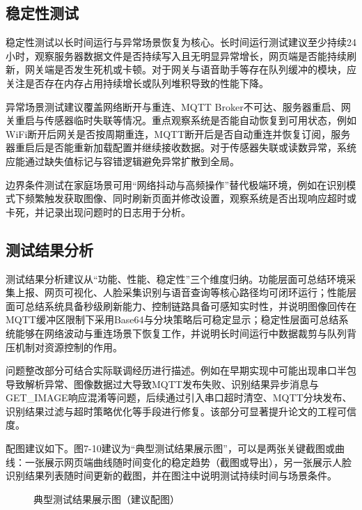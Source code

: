 \subsection{稳定性测试}
\par 稳定性测试以长时间运行与异常场景恢复为核心。长时间运行测试建议至少持续24小时，观察服务器数据文件是否持续写入且无明显异常增长，网页端是否能持续刷新，网关端是否发生死机或卡顿。对于网关与语音助手等存在队列缓冲的模块，应关注是否存在内存占用持续增长或队列堆积导致的性能下降。
\par 异常场景测试建议覆盖网络断开与重连、MQTT Broker不可达、服务器重启、网关重启与传感器临时失联等情况。重点观察系统是否能自动恢复到可用状态，例如WiFi断开后网关是否按周期重连，MQTT断开后是否自动重连并恢复订阅，服务器重启后是否能重新加载配置并继续接收数据。对于传感器失联或读数异常，系统应能通过缺失值标记与容错逻辑避免异常扩散到全局。
\par 边界条件测试在家庭场景可用“网络抖动与高频操作”替代极端环境，例如在识别模式下频繁触发获取图像、同时刷新页面并修改设置，观察系统是否出现响应超时或卡死，并记录出现问题时的日志用于分析。

\subsection{测试结果分析}
\par 测试结果分析建议从“功能、性能、稳定性”三个维度归纳。功能层面可总结环境采集上报、网页可视化、人脸采集识别与语音查询等核心路径均可闭环运行；性能层面可总结系统具备秒级刷新能力、控制链路具备可感知实时性，并说明图像回传在MQTT缓冲区限制下采用Base64与分块策略后可稳定显示；稳定性层面可总结系统能够在网络波动与重连场景下恢复工作，并说明长时间运行中数据裁剪与队列背压机制对资源控制的作用。
\par 问题整改部分可结合实际联调经历进行描述。例如在早期实现中可能出现串口半包导致解析异常、图像数据过大导致MQTT发布失败、识别结果异步消息与GET\_IMAGE响应混淆等问题，后续通过引入串口超时清空、MQTT分块发布、识别结果过滤与超时策略优化等手段进行修复。该部分可显著提升论文的工程可信度。
\par 配图建议如下。图7-10建议为“典型测试结果展示图”，可以是两张关键截图或曲线：一张展示网页端曲线随时间变化的稳定趋势（截图或导出），另一张展示人脸识别结果列表随时间更新的截图，并在图注中说明测试持续时间与场景条件。
\begin{figure}[H]
\centering
{}
\caption{典型测试结果展示图（建议配图）}
\label{fig:test_results}
\end{figure}
